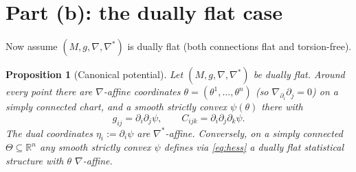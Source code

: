 \documentclass{amsart}
\newtheorem{proposition}{Proposition}
\theoremstyle{definition}
\theoremstyle{remark}
\begin{document}
\section{Part (b): the dually flat case}

Now assume $(M,g,\nabla,\nabla^{*})$ is dually flat (both connections flat and
torsion-free).

\begin{proposition}[Canonical potential]\label{prop:hessian}
Let $(M,g,\nabla,\nabla^{*})$ be dually flat. Around every point there are
$\nabla$-affine coordinates $\theta=(\theta^{1},\dots,\theta^{n})$ (so
$\nabla_{\partial_{i}}\partial_{j}=0$) on a simply connected chart, and a smooth
strictly convex $\psi(\theta)$ there with
\begin{equation}\label{eq:hess}
  g_{ij}=\partial_{i}\partial_{j}\psi,\qquad
  C_{ijk}=\partial_{i}\partial_{j}\partial_{k}\psi .
\end{equation}
The dual coordinates $\eta_{i}:=\partial_{i}\psi$ are $\nabla^{*}$-affine.
Conversely, on a simply connected $\Theta\subseteq\mathbb R^{n}$ any smooth
strictly convex $\psi$ defines via \eqref{eq:hess} a dually flat statistical
structure with $\theta$ $\nabla$-affine.
\end{proposition}
\end{document}
